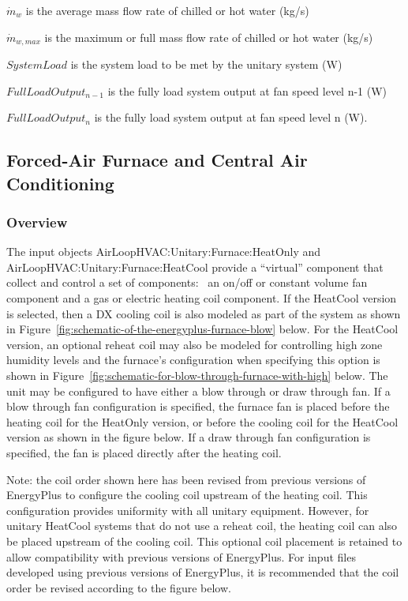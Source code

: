 $\dot{m}_{w}$ is the average mass flow rate of chilled or hot water (kg/s)

$\dot{m}_{w, max}$ is the maximum or full mass flow rate of chilled or hot water (kg/s)

$SystemLoad$ is the system load to be met by the unitary system (W)

$FullLoadOutput_{n-1}$ is the fully load system output at fan speed level n-1 (W)

$FullLoadOutput_{n}$ is the fully load system output at fan speed level n (W).

\subsection{Forced-Air Furnace and Central Air Conditioning}\label{forced-air-furnace-and-central-air-conditioning}

\subsubsection{Overview}\label{overview-1}

The input objects AirLoopHVAC:Unitary:Furnace:HeatOnly and \\
AirLoopHVAC:Unitary:Furnace:HeatCool provide a ``virtual'' component that collect and control a set of components:~ an on/off or constant volume fan component and a gas or electric heating coil component. If the HeatCool version is selected, then a DX cooling coil is also modeled as part of the system as shown in Figure~\ref{fig:schematic-of-the-energyplus-furnace-blow} below. For the HeatCool version, an optional reheat coil may also be modeled for controlling high zone humidity levels and the furnace's configuration when specifying this option is shown in Figure~\ref{fig:schematic-for-blow-through-furnace-with-high} below. The unit may be configured to have either a blow through or draw through fan. If a blow through fan configuration is specified, the furnace fan is placed before the heating coil for the HeatOnly version, or before the cooling coil for the HeatCool version as shown in the figure below. If a draw through fan configuration is specified, the fan is placed directly after the heating coil.

Note: the coil order shown here has been revised from previous versions of EnergyPlus to configure the cooling coil upstream of the heating coil. This configuration provides uniformity with all unitary equipment. However, for unitary HeatCool systems that do not use a reheat coil, the heating coil can also be placed upstream of the cooling coil. This optional coil placement is retained to allow compatibility with previous versions of EnergyPlus. For input files developed using previous versions of EnergyPlus, it is recommended that the coil order be revised according to the figure below.

